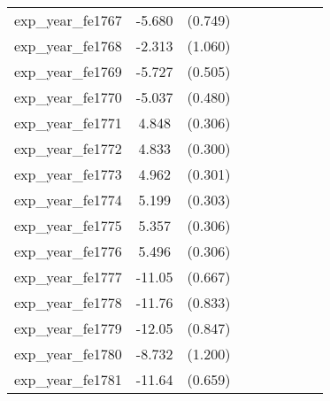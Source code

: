 {\begin{tabular}{l*{4}{cc}}
exp\_year\_fe1767&   -5.680\sym{***}&  (0.749)&                  &         &                  &         &                  &         \\
exp\_year\_fe1768&   -2.313\sym{*}  &  (1.060)&                  &         &                  &         &                  &         \\
exp\_year\_fe1769&   -5.727\sym{***}&  (0.505)&                  &         &                  &         &                  &         \\
exp\_year\_fe1770&   -5.037\sym{***}&  (0.480)&                  &         &                  &         &                  &         \\
exp\_year\_fe1771&    4.848\sym{***}&  (0.306)&                  &         &                  &         &                  &         \\
exp\_year\_fe1772&    4.833\sym{***}&  (0.300)&                  &         &                  &         &                  &         \\
exp\_year\_fe1773&    4.962\sym{***}&  (0.301)&                  &         &                  &         &                  &         \\
exp\_year\_fe1774&    5.199\sym{***}&  (0.303)&                  &         &                  &         &                  &         \\
exp\_year\_fe1775&    5.357\sym{***}&  (0.306)&                  &         &                  &         &                  &         \\
exp\_year\_fe1776&    5.496\sym{***}&  (0.306)&                  &         &                  &         &                  &         \\
exp\_year\_fe1777&   -11.05\sym{***}&  (0.667)&                  &         &                  &         &                  &         \\
exp\_year\_fe1778&   -11.76\sym{***}&  (0.833)&                  &         &                  &         &                  &         \\
exp\_year\_fe1779&   -12.05\sym{***}&  (0.847)&                  &         &                  &         &                  &         \\
exp\_year\_fe1780&   -8.732\sym{***}&  (1.200)&                  &         &                  &         &                  &         \\
exp\_year\_fe1781&   -11.64\sym{***}&  (0.659)&                  &         &                  &         &                  &         \\

\end{tabular}}
